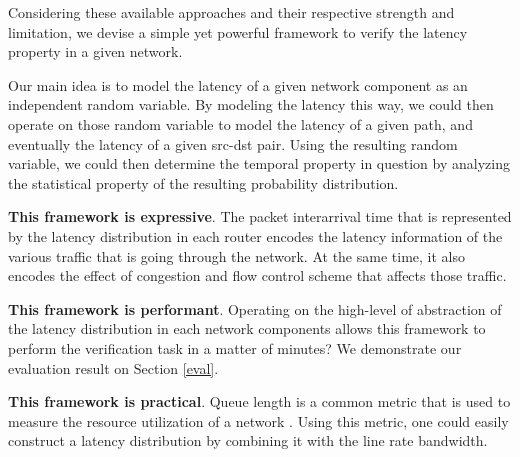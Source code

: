 Considering these available approaches and their respective strength and limitation, we devise a 
simple yet powerful framework to verify the latency property in a given network.

Our main idea is to model the latency of a given network component as an independent random variable.
By modeling the latency this way, we could then operate on those random variable to model the latency 
of a given path, and eventually the latency of a given src-dst pair.
Using the resulting random variable, we could then determine the temporal property in question by 
analyzing the statistical property of the resulting probability distribution.

\textbf{This framework is expressive}.
The packet interarrival time that is represented by the latency distribution in each router encodes the 
latency information of the various traffic that is going through the network.
At the same time, it also encodes the effect of congestion and flow control scheme that affects 
those traffic.

\textbf{This framework is performant}.
Operating on the high-level of abstraction of the latency distribution in each network components allows 
this framework to perform the verification task in a matter of minutes?
We demonstrate our evaluation result on Section \ref{eval}.

\textbf{This framework is practical}.
Queue length is a common metric that is used to measure the resource utilization of a network 
\cite{dctcp} \cite{swift}.
Using this metric, one could easily construct a latency distribution by combining it with the 
line rate bandwidth.



